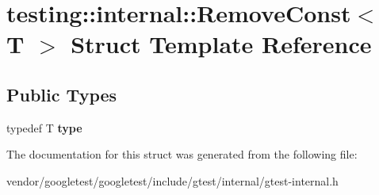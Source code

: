 \hypertarget{structtesting_1_1internal_1_1_remove_const}{}\section{testing\+:\+:internal\+:\+:Remove\+Const$<$ T $>$ Struct Template Reference}
\label{structtesting_1_1internal_1_1_remove_const}
\subsection*{Public Types}
\begin{DoxyCompactItemize}
\item 
\mbox{\label{structtesting_1_1internal_1_1_remove_const_a1be32027ea4edcc0d15abd59aba4a97f}} 
typedef T {\bfseries type}
\end{DoxyCompactItemize}


The documentation for this struct was generated from the following file\+:\begin{DoxyCompactItemize}
\item 
vendor/googletest/googletest/include/gtest/internal/gtest-\/internal.\+h\end{DoxyCompactItemize}
